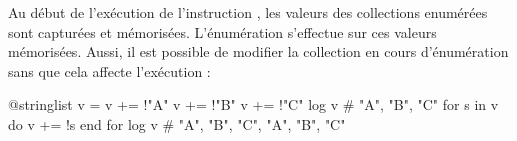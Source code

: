 {Au début de l'exécution de l'instruction , les valeurs des collections enumérées sont capturées et mémorisées. L'énumération s'effectue sur ces valeurs mémorisées. Aussi, il est possible de modifier la collection en cours d'énumération sans que cela affecte l'exécution :
\begin{galgascode}
@stringlist v = {}
v += !"A"
v += !"B"
v += !"C"
log v # "A", "B", "C"
for s in v do
  v += !s
end for
log v # "A", "B", "C", "A", "B", "C"
\end{galgascode}


















}
